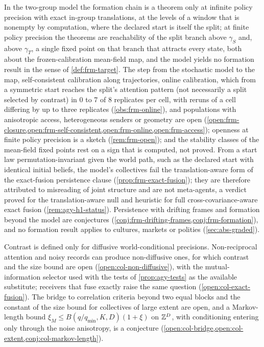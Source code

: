 In the two-group model the formation chain is a theorem only at infinite policy precision with exact in-group translations, at the levels of a window that is nonempty by computation, where the declared start is itself the split; at finite policy precision the theorems are reachability of the split branch above $\gamma_S$ and, above $\gamma_T$, a single fixed point on that branch that attracts every state, both about the frozen-calibration mean-field map, and the model yields no formation result in the sense of \cref{def:frm-target}. The step from the stochastic model to the map, self-consistent calibration along trajectories, online calibration, which from a symmetric start reaches the split's attention pattern (not necessarily a split selected by contrast) in 0 to 7 of 8 replicates per cell, with reruns of a cell differing by up to three replicates (\cref{obs:frm-online}), and populations with anisotropic access, heterogeneous senders or geometry are open (\cref{open:frm-closure,open:frm-self-consistent,open:frm-online,open:frm-access}); openness at finite policy precision is a sketch (\cref{rem:frm-open}); and the stability classes of the mean-field fixed points rest on a sign that is computed, not proved. From a start law permutation-invariant given the world path, such as the declared start with identical initial beliefs, the model's collectives fail the translation-aware form of the exact-fusion persistence clause (\cref{prop:frm-exact-fusion}); they are therefore attributed to misreading of joint structure and are not meta-agents, a verdict proved for the translation-aware null and heuristic for full cross-covariance-aware exact fusion (\cref{rem:agy-h1-status}). Persistence with drifting frames and formation beyond the model are conjectures (\cref{conj:frm-drifting-frames,conj:frm-formation}), and no formation result applies to cultures, markets or polities (\cref{sec:abs-graded}).

Contrast is defined only for diffusive world-conditional precisions. Non-reciprocal attention and noisy records can produce non-diffusive ones, for which contrast and the size bound are open (\cref{open:col-non-diffusive}), with the mutual-information selector used with the tests of \cref{prop:agy-tests} as the available substitute; receivers that fuse exactly raise the same question (\cref{open:col-exact-fusion}). The bridge to correlation criteria beyond two equal blocks and the constant of the size bound for collectives of large extent are open, and a Markov-length bound $\xi_M\le B(q/q_{\min},K,D)(1+\xi)$ on $\mathbb{Z}^D$, with conditioning entering only through the noise anisotropy, is a conjecture (\cref{open:col-bridge,open:col-extent,conj:col-markov-length}).

